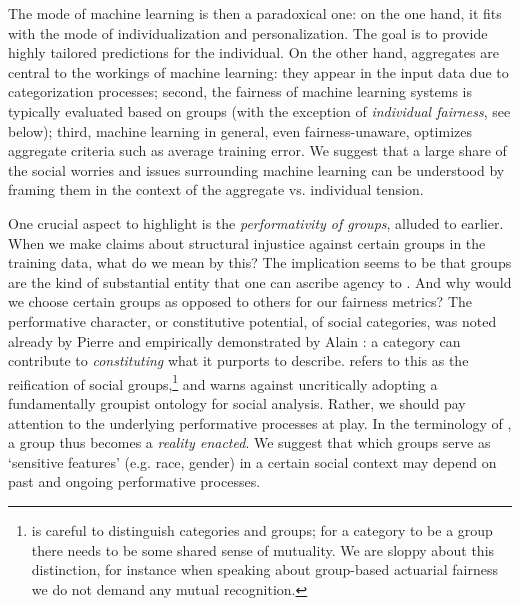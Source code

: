 \documentclass[11pt]{article} %
\makeatletter
\newcommand*{\eg}{e.g.\@\xspace}
\newcommand*{\versus}{vs.\@\xspace}
\makeatother
\begin{document}
The mode of machine learning is then a paradoxical one: on the one hand, it fits with the mode of individualization and personalization. The goal is to provide highly tailored predictions for the individual. On the other hand, aggregates are central to the workings of machine learning: they appear in the input data due to categorization processes; second, the fairness of machine learning systems is typically evaluated based on groups (with the exception of \textit{individual fairness}, see below); third, machine learning in general, even fairness-unaware, optimizes aggregate criteria such as average training error. We suggest that a large share of the social worries and issues surrounding machine learning can be understood by framing them in the context of the aggregate \versus individual tension.

One crucial aspect to highlight is the \textit{performativity of groups}, alluded to earlier. When we make claims about structural injustice against certain groups in the training data, what do we mean by this? The implication seems to be that groups are the kind of substantial entity that one can ascribe agency to \citep{brubaker2002ethnicity}. And why would we choose certain groups as opposed to others for our fairness metrics?
The performative character, or constitutive potential, of social categories, was noted already by Pierre \citet{bourdieu1991identity}  and empirically demonstrated by Alain \citet{desrosieres1998politics}: a category can contribute to \textit{constituting} what it purports to describe. \citet{brubaker2002ethnicity} refers to this as the reification of social groups,\footnote{\citet{brubaker2002ethnicity} is careful to distinguish categories and groups; for a category to be a group there needs to be some shared sense of mutuality. We are sloppy about this distinction, for instance when speaking about group-based actuarial fairness we do not demand any mutual recognition.} and warns against uncritically adopting a fundamentally groupist ontology for social analysis. Rather, we should pay attention to the underlying performative processes at play.  In the terminology of \citet{mol2002body}, a group thus becomes a \textit{reality enacted}.
We suggest that which groups serve as `sensitive features' (\eg race, gender) in a certain social context may depend on past and ongoing performative processes. 
\end{document}
